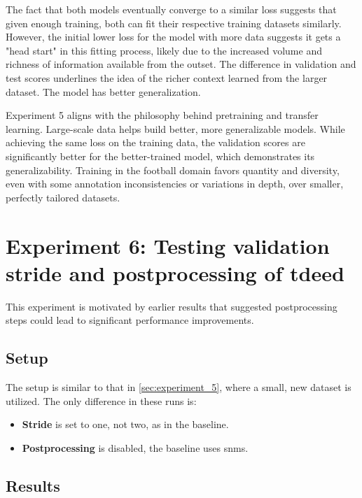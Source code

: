 The fact that both models eventually converge to a similar loss suggests that given enough training, both can fit their respective training datasets similarly. However, the initial lower loss for the model with more data suggests it gets a "head start" in this fitting process, likely due to the increased volume and richness of information available from the outset. The difference in validation and test scores underlines the idea of the richer context learned from the larger dataset. The model has better generalization. 

Experiment 5 aligns with the philosophy behind pretraining and transfer learning. Large-scale data helps build better, more generalizable models. While achieving the same loss on the training data, the validation scores are significantly better for the better-trained model, which demonstrates its generalizability. Training in the football domain favors quantity and diversity, even with some annotation inconsistencies or variations in depth, over smaller, perfectly tailored datasets.

\section{Experiment 6: Testing validation stride and postprocessing of \acrshort{tdeed}}
\label{sec:experiment_6}

This experiment is motivated by earlier results that suggested postprocessing steps could lead to significant performance improvements. 

\subsection{Setup}
\label{ssec:ex6_setup}
The setup is similar to that in \cref{sec:experiment_5}, where a small, new dataset is utilized. The only difference in these runs is:

\begin{itemize}
    \item \textbf{Stride} is set to one, not two, as in the baseline.
    \item \textbf{Postprocessing} is disabled, the baseline uses \acrlong{snms}.
\end{itemize}

\subsection{Results}
\label{ssec:ex6_results}

